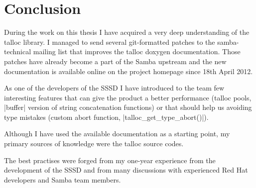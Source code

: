\chapter{Conclusion}

During the work on this thesis I have acquired a very deep understanding of the
talloc library. I managed to send several git-formatted patches to the
samba-technical mailing list that improves the talloc doxygen documentation.
Those patches have already become a part of the Samba upstream and the new
documentation is available online on the project homepage since 18th April 2012.

As one of the developers of the SSSD I have introduced to the team few
interesting features that can give the product a better performance (talloc
pools, |buffer| version of string concatenation functions) or that should help
us avoiding type mistakes (custom abort function, |talloc_get_type_abort()|).

Although I have used the available documentation as a starting point, my primary
sources of knowledge were the talloc source codes.

The best practises were forged from my one-year experience from the development
of the SSSD and from many discussions with experienced Red Hat developers and
Samba team members.


% 
